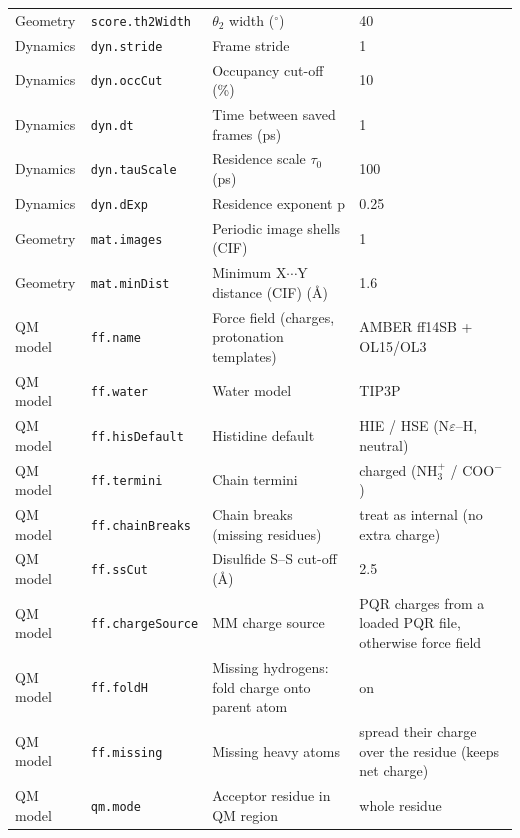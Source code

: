 \documentclass[journal=jcisd8,manuscript=suppinfo]{achemso}
\begin{document}
\begin{singlespace}
{\begin{longtable}{llp{4.2cm}l}
Geometry & \texttt{score.th2Width} & $\theta_2$ width ($^\circ$) & \parbox[t]{5.0cm}{\raggedright 40}\\
Dynamics & \texttt{dyn.stride} & Frame stride & \parbox[t]{5.0cm}{\raggedright 1}\\
Dynamics & \texttt{dyn.occCut} & Occupancy cut-off (\%) & \parbox[t]{5.0cm}{\raggedright 10}\\
Dynamics & \texttt{dyn.dt} & Time between saved frames (ps) & \parbox[t]{5.0cm}{\raggedright 1}\\
Dynamics & \texttt{dyn.tauScale} & Residence scale $\tau_0$ (ps) & \parbox[t]{5.0cm}{\raggedright 100}\\
Dynamics & \texttt{dyn.dExp} & Residence exponent p & \parbox[t]{5.0cm}{\raggedright 0.25}\\
Geometry & \texttt{mat.images} & Periodic image shells (CIF) & \parbox[t]{5.0cm}{\raggedright 1}\\
Geometry & \texttt{mat.minDist} & Minimum X$\cdots$Y distance (CIF) (\AA{}) & \parbox[t]{5.0cm}{\raggedright 1.6}\\
QM model & \texttt{ff.name} & Force field (charges, protonation templates) & \parbox[t]{5.0cm}{\raggedright AMBER ff14SB + OL15/OL3}\\
QM model & \texttt{ff.water} & Water model & \parbox[t]{5.0cm}{\raggedright TIP3P}\\
QM model & \texttt{ff.hisDefault} & Histidine default & \parbox[t]{5.0cm}{\raggedright HIE / HSE (N$\varepsilon$--H, neutral)}\\
QM model & \texttt{ff.termini} & Chain termini & \parbox[t]{5.0cm}{\raggedright charged (NH$_3^+$ / COO$^-$)}\\
QM model & \texttt{ff.chainBreaks} & Chain breaks (missing residues) & \parbox[t]{5.0cm}{\raggedright treat as internal (no extra charge)}\\
QM model & \texttt{ff.ssCut} & Disulfide S--S cut-off (\AA{}) & \parbox[t]{5.0cm}{\raggedright 2.5}\\
QM model & \texttt{ff.chargeSource} & MM charge source & \parbox[t]{5.0cm}{\raggedright PQR charges from a loaded PQR file, otherwise force field}\\
QM model & \texttt{ff.foldH} & Missing hydrogens: fold charge onto parent atom & \parbox[t]{5.0cm}{\raggedright on}\\
QM model & \texttt{ff.missing} & Missing heavy atoms & \parbox[t]{5.0cm}{\raggedright spread their charge over the residue (keeps net charge)}\\
QM model & \texttt{qm.mode} & Acceptor residue in QM region & \parbox[t]{5.0cm}{\raggedright whole residue}\\

\end{longtable}}
\end{singlespace}
\end{document}
